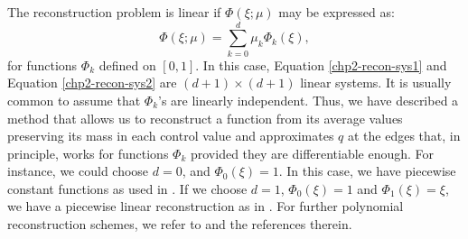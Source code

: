 The reconstruction problem is linear if $\Phi(\xi;\mu)$ may be expressed as:
\begin{equation*}
	\Phi(\xi;\mu) = \sum_{k=0}^d \mu_k \Phi_k(\xi),
\end{equation*}
for functions $\Phi_k$ defined on $[0,1]$. In this case, Equation \eqref{chp2-recon-sys1} and  Equation \eqref{chp2-recon-sys2}
are $(d+1)\times (d+1)$ linear systems.
It is usually common to assume that $\Phi_k$'s are linearly independent.
Thus, we have described a method that allows us to reconstruct a function from its average values
preserving its mass in each control value and approximates $q$ at the edges that, in principle,
works for functions $\Phi_k$ provided they are differentiable enough.
For instance, we could choose $d=0$, and $\Phi_0(\xi)=1$. 
In this case, we have piecewise constant functions as used in \citet{godunov:1959}.
If we choose $d=1$, $\Phi_0(\xi)=1$ and $\Phi_1(\xi)=\xi$, 
we have a piecewise linear reconstruction as in \citet{vanleer:1977}. 
For further polynomial reconstruction schemes, we refer to \citet{engwirda:2016} and the references therein.

